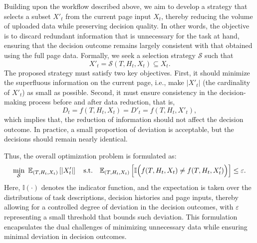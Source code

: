 Building upon the workflow described above, we aim to develop a strategy that selects a subset \(X'_t\) from the current page input \(X_t\), thereby reducing the volume of uploaded data while preserving decision quality. In other words, the objective is to discard redundant information that is unnecessary for the task at hand, ensuring that the decision outcome remains largely consistent with that obtained using the full page data. Formally, we seek a selection strategy \(\mathcal{S}\) such that
\begin{equation}
X'_t = \mathcal{S}(T, H_t, X_t) \subseteq X_t.
\end{equation}
The proposed strategy must satisfy two key objectives. First, it should minimize the superfluous information on the current page, i.e., make \(|X'_t|\) (the cardinality of \(X'_t\)) as small as possible. Second, it must ensure consistency in the decision-making process before and after data reduction, that is,
\begin{equation}
D_t = f(T, H_t, X_t) = D'_t = f(T, H_t, X'_t),
\end{equation}
which implies that, the reduction of information should not affect the decision outcome. In practice, a small proportion of deviation is acceptable, but the decisions should remain nearly identical.

Thus, the overall optimization problem is formulated as:
\begin{equation}\label{equation4}
\min_{\mathcal{S}} \ \mathbb{E}_{(T,H_t,X_t)}\left[ |X'_t| \right] \quad \text{s.t.} \quad \mathbb{E}_{(T,H_t,X_t)}\left[ \mathbb{I}\Bigl( f(T, H_t, X_t) \neq f(T, H_t, X'_t) \Bigr) \right] \le \varepsilon.
\end{equation}
Here, \(\mathbb{I}(\cdot)\) denotes the indicator function, and the expectation is taken over the distributions of task descriptions, decision histories and page inputs, thereby allowing for a controlled degree of deviation in the decision outcomes, with \(\varepsilon\) representing a small threshold that bounds such deviation. This formulation encapsulates the dual challenges of minimizing unnecessary data while ensuring minimal deviation in decision outcomes.